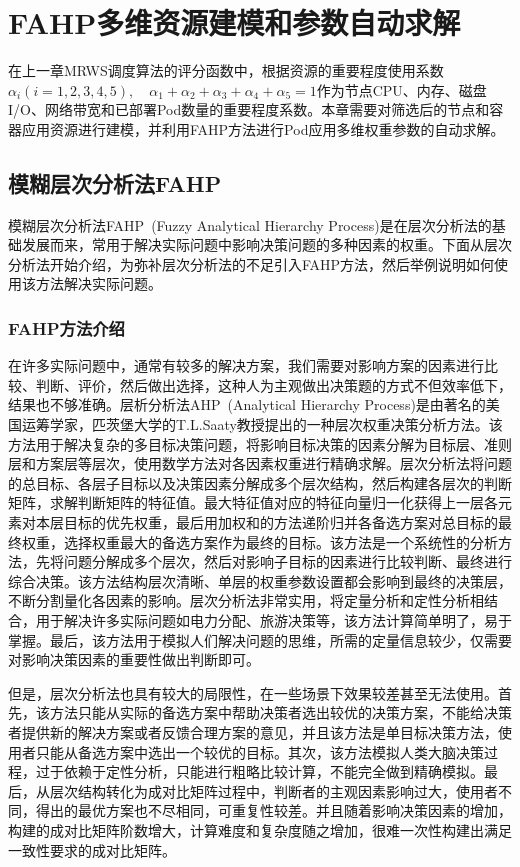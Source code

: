 \chapter{FAHP多维资源建模和参数自动求解}
在上一章MRWS调度算法的评分函数中，根据资源的重要程度使用系数$\alpha_{i}(i=1,2,3,4,5), \quad\alpha_{1}+\alpha_{2}+\alpha_{3}+\alpha_{4}+\alpha_{5}=1$作为节点CPU、内存、磁盘I/O、网络带宽和已部署Pod数量的重要程度系数。本章需要对筛选后的节点和容器应用资源进行建模，并利用FAHP方法进行Pod应用多维权重参数的自动求解。

\section{模糊层次分析法FAHP}
模糊层次分析法FAHP~\cite{Kwong2002A,Hong2013Cloud}(Fuzzy Analytical Hierarchy Process)是在层次分析法的基础发展而来，常用于解决实际问题中影响决策问题的多种因素的权重。下面从层次分析法开始介绍，为弥补层次分析法的不足引入FAHP方法，然后举例说明如何使用该方法解决实际问题。

\subsection{FAHP方法介绍}
在许多实际问题中，通常有较多的解决方案，我们需要对影响方案的因素进行比较、判断、评价，然后做出选择，这种人为主观做出决策题的方式不但效率低下，结果也不够准确。层析分析法AHP~\cite{Saaty1994How,Deng2012}(Analytical Hierarchy Process)是由著名的美国运筹学家，匹茨堡大学的T.L.Saaty教授提出的一种层次权重决策分析方法。该方法用于解决复杂的多目标决策问题，将影响目标决策的因素分解为目标层、准则层和方案层等层次，使用数学方法对各因素权重进行精确求解。层次分析法将问题的总目标、各层子目标以及决策因素分解成多个层次结构，然后构建各层次的判断矩阵，求解判断矩阵的特征值。最大特征值对应的特征向量归一化获得上一层各元素对本层目标的优先权重，最后用加权和的方法递阶归并各备选方案对总目标的最终权重，选择权重最大的备选方案作为最终的目标。该方法是一个系统性的分析方法，先将问题分解成多个层次，然后对影响子目标的因素进行比较判断、最终进行综合决策。该方法结构层次清晰、单层的权重参数设置都会影响到最终的决策层，不断分割量化各因素的影响。层次分析法非常实用，将定量分析和定性分析相结合，用于解决许多实际问题如电力分配、旅游决策等，该方法计算简单明了，易于掌握。最后，该方法用于模拟人们解决问题的思维，所需的定量信息较少，仅需要对影响决策因素的重要性做出判断即可。

但是，层次分析法也具有较大的局限性，在一些场景下效果较差甚至无法使用。首先，该方法只能从实际的备选方案中帮助决策者选出较优的决策方案，不能给决策者提供新的解决方案或者反馈合理方案的意见，并且该方法是单目标决策方法，使用者只能从备选方案中选出一个较优的目标。其次，该方法模拟人类大脑决策过程，过于依赖于定性分析，只能进行粗略比较计算，不能完全做到精确模拟。最后，从层次结构转化为成对比矩阵过程中，判断者的主观因素影响过大，使用者不同，得出的最优方案也不尽相同，可重复性较差。并且随着影响决策因素的增加，构建的成对比矩阵阶数增大，计算难度和复杂度随之增加，很难一次性构建出满足一致性要求的成对比矩阵。


